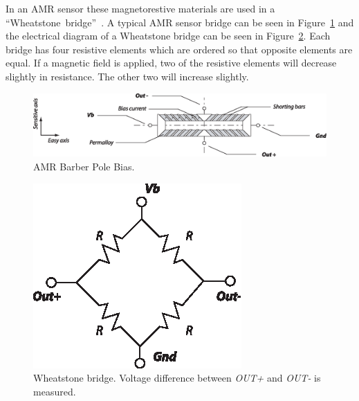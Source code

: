 In an AMR sensor these magnetorestive materials are used in a ``Wheatstone~bridge''~\cite{an218}. A typical AMR sensor bridge can be seen in Figure~\ref{fig-barberpole} and the electrical diagram of a Wheatstone bridge can be seen in Figure~\ref{fig-wheatstone}. Each bridge has four resistive elements which are ordered so that opposite elements are equal. If a magnetic field is applied, two of the resistive elements will decrease slightly in resistance. The other two will increase slightly.

\begin{figure}
\centering
\begin{minipage}{1\linewidth}
 \centering
 \includegraphics[width=1\linewidth]{images/barberpole}
 \caption[AMR Barber Pole Bias]{AMR Barber Pole Bias.}
 \label{fig-barberpole}
\end{minipage}
\end{figure}

\begin{figure}
\centering
\begin{minipage}{0.3\linewidth}
 \centering
 \includegraphics[width=1\linewidth]{images/wheatstone}
 \caption[Wheatstone bridge]{Wheatstone bridge. Voltage difference between \emph{OUT+} and \emph{OUT-} is measured.}
 \label{fig-wheatstone}
\end{minipage}
\end{figure}

